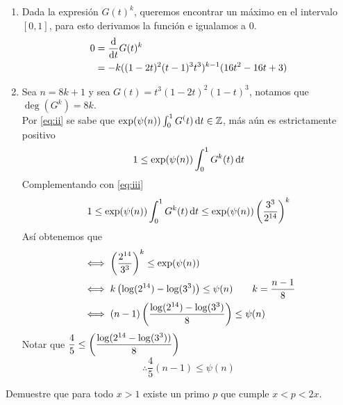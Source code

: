 \begin{sol}
\begin{enumerate}[label = \roman*]
		\item Dada la expresión $G(t)^k$, queremos encontrar un máximo en el intervalo $[0,1]$, para esto derivamos la función e igualamos a 0.
		      \begin{align*}
			      0 & =\frac{\operatorname{d}\!{}}{\operatorname{d}\!{t}}G(t)^k                    \\
			        & =-k ((1-2t)^2(t-1)^3t^3)^{k-1} (16t^2-16t+3)
		      \end{align*}
		      \label{eq:iii}
		\item Sea $n=8k+1$ y sea $G(t)=t^3(1-2t)^2(1-t)^3$, notamos que $\deg(G^k)=8k$.\\
		      Por \eqref{eq:ii} se sabe que $\exp(\psi(n))\int_0^1G^(t)\operatorname{d}\!{t}\in\mathbb{Z}$, más aún es estrictamente positivo
		      \begin{equation*}
			      1\leq\exp(\psi(n))\int_0^1G^k(t)\operatorname{d}\!{t}
		      \end{equation*}
		      Complementando con \eqref{eq:iii}
		      \begin{equation*}
			      1\leq\exp(\psi(n))\int_0^1G^k(t)\operatorname{d}\!{t}\leq\exp(\psi(n))\left(\frac{3^3}{2^{14}}\right)^k
		      \end{equation*}
		      Así obtenemos que
		      \begin{align*}
			       & \iff\left(\dfrac{2^{14}}{3^3}\right)^k\leq\exp(\psi(n))                    \\
			       & \iff k\left(\log(2^{14})-\log(3^3)\right)\leq\psi(n)\qquad k=\frac{n-1}{8} \\
			       & \iff (n-1)\left(\frac{\log(2^{14})-\log(3^3)}8\right)\leq\psi(n)
		      \end{align*}
		      Notar que $\dfrac45\leq\left(\dfrac{\log(2^{14}-\log(3^3))}8\right)$
		      \begin{equation*}
			      \therefore\frac45(n-1)\leq\psi(n)
		      \end{equation*}
	\end{enumerate}
\end{sol}

\begin{prob}[5 pts.]
	Demuestre que para todo $x>1$ existe un primo $p$ que cumple $x<p<2x$.
\end{prob}

